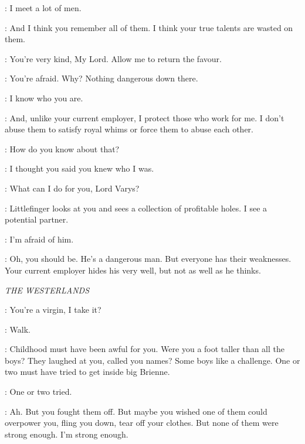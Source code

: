 \ROS: I meet a lot of men. 

\VARYS: And I think you remember all of them. I think your true talents are wasted on them. 

\ROS: You're very kind, My Lord. Allow me to return the favour. 


\VARYS: You're afraid. Why? Nothing dangerous down there. 

\ROS: I know who you are. 

\VARYS: And, unlike your current employer, I protect those who work for me. I don't abuse them to satisfy royal whims or force them to abuse each other. 

\ROS: How do you know about that? 

\VARYS: I thought you said you knew who I was. 

\ROS: What can I do for you, Lord Varys?


\VARYS: Littlefinger looks at you and sees a collection of profitable holes. I see a potential partner. 

\ROS: I'm afraid of him. 

\VARYS: Oh, you should be. He's a dangerous man. But everyone has their weaknesses. Your current employer hides his very well, but not as well as he thinks. 


\scene

\textit{THE WESTERLANDS} 


\JAIME: You're a virgin, I take it?


\BRIENNE: Walk. 


\JAIME: Childhood must have been awful for you. Were you a foot taller than all the boys? They laughed at you, called you names? Some boys like a challenge. One or two must have tried to get inside big Brienne. 

\BRIENNE: One or two tried. 

\JAIME: Ah. But you fought them off. But maybe you wished one of them could overpower you, fling you down, tear off your clothes. But none of them were strong enough. I'm strong enough. 

